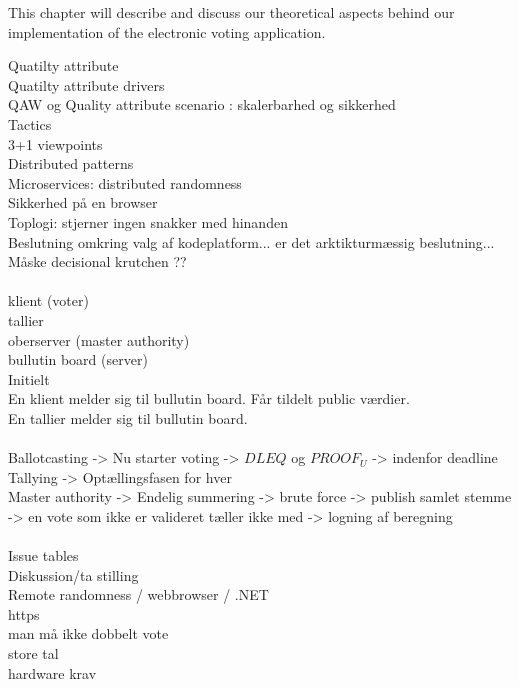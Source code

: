 \noindent
This chapter will describe and discuss our theoretical aspects behind our implementation of the electronic voting application.  


















\noindent
Quatilty attribute\\
Quatilty attribute drivers\\
QAW og Quality attribute scenario : skalerbarhed og sikkerhed\\
Tactics\\
3+1 viewpoints\\
Distributed patterns\\
Microservices: distributed randomness\\
Sikkerhed på en browser\\
Toplogi: stjerner ingen snakker med hinanden\\
Beslutning omkring valg af kodeplatform... er det arktikturmæssig beslutning... Måske decisional krutchen ??\\\\

\noindent
klient (voter)\\
tallier\\
oberserver (master authority)\\
bullutin board (server)\\
\noindent
Initielt\\
En klient melder sig til bullutin board. Får tildelt public værdier. \\
En tallier melder sig til bullutin board. \\\\
\noindent
Ballotcasting -> Nu starter voting ->  $DLEQ$ og $PROOF_U$ -> indenfor deadline\\
Tallying -> Optællingsfasen for hver \\
Master authority -> Endelig summering -> brute force -> publish samlet stemme -> en vote som ikke er valideret tæller ikke med -> logning af beregning \\\\

\noindent
Issue tables\\
Diskussion/ta stilling \\
Remote randomness / webbrowser / .NET\\
https\\
man må ikke dobbelt vote\\
store tal\\
hardware krav